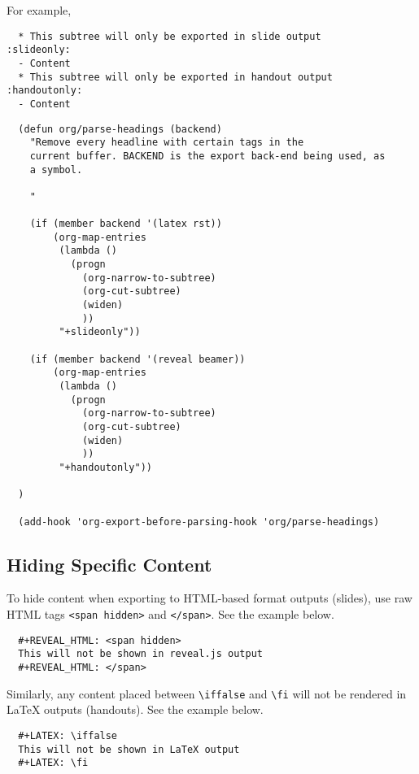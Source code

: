 \documentclass[10pt,article]{article}
\begin{document}
For example,

\begin{verbatim}
  * This subtree will only be exported in slide output      :slideonly:
  - Content
  * This subtree will only be exported in handout output    :handoutonly:
  - Content
\end{verbatim}

{\small
\begin{verbatim}
  (defun org/parse-headings (backend)
    "Remove every headline with certain tags in the
    current buffer. BACKEND is the export back-end being used, as
    a symbol.
  
    "
  
    (if (member backend '(latex rst))
        (org-map-entries
         (lambda ()
           (progn
             (org-narrow-to-subtree)
             (org-cut-subtree)
             (widen)
             ))
         "+slideonly"))
  
    (if (member backend '(reveal beamer))
        (org-map-entries
         (lambda ()
           (progn
             (org-narrow-to-subtree)
             (org-cut-subtree)
             (widen)
             ))
         "+handoutonly"))
  
  )
  
  (add-hook 'org-export-before-parsing-hook 'org/parse-headings)
\end{verbatim}
}
\subsection{Hiding Specific Content}
\label{sec:orgc4d77d6}
To hide content when exporting to HTML-based format outputs (slides), use raw
HTML tags \texttt{<span hidden>} and \texttt{</span>}. See the example below.

{\small
\begin{verbatim}
  #+REVEAL_HTML: <span hidden>
  This will not be shown in reveal.js output
  #+REVEAL_HTML: </span>
\end{verbatim}
}

Similarly, any content placed between \texttt{\textbackslash{}iffalse} and \texttt{\textbackslash{}fi} will not be
rendered in \LaTeX{} outputs (handouts). See the example below.

{\small
\begin{verbatim}
  #+LATEX: \iffalse
  This will not be shown in LaTeX output
  #+LATEX: \fi
\end{verbatim}
}
\end{document}
